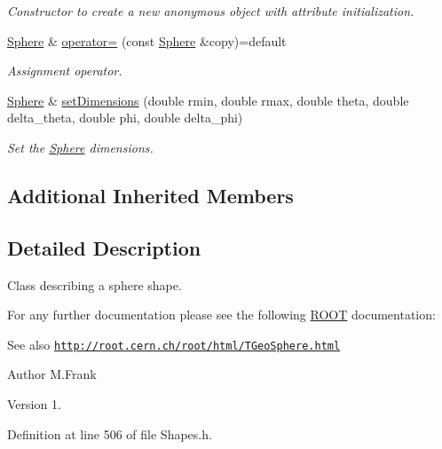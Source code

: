 \begin{DoxyCompactItemize}
\begin{DoxyCompactList}\small\item\em Constructor to create a new anonymous object with attribute initialization. \end{DoxyCompactList}\item 
\hyperlink{class_d_d4hep_1_1_geometry_1_1_sphere}{Sphere} \& \hyperlink{class_d_d4hep_1_1_geometry_1_1_sphere_af5e712c2ced0fafb230be48a60b1bb12}{operator=} (const \hyperlink{class_d_d4hep_1_1_geometry_1_1_sphere}{Sphere} \&copy)=default
\begin{DoxyCompactList}\small\item\em Assignment operator. \end{DoxyCompactList}\item 
\hyperlink{class_d_d4hep_1_1_geometry_1_1_sphere}{Sphere} \& \hyperlink{class_d_d4hep_1_1_geometry_1_1_sphere_a0c80e5f5655ed0211c769d9193461d79}{set\+Dimensions} (double rmin, double rmax, double theta, double delta\+\_\+theta, double phi, double delta\+\_\+phi)
\begin{DoxyCompactList}\small\item\em Set the \hyperlink{class_d_d4hep_1_1_geometry_1_1_sphere}{Sphere} dimensions. \end{DoxyCompactList}\end{DoxyCompactItemize}
\subsection*{Additional Inherited Members}


\subsection{Detailed Description}
Class describing a sphere shape. 

For any further documentation please see the following \hyperlink{namespace_r_o_o_t}{R\+O\+OT} documentation\+: \begin{DoxySeeAlso}{See also}
\href{http://root.cern.ch/root/html/TGeoSphere.html}{\tt http\+://root.\+cern.\+ch/root/html/\+T\+Geo\+Sphere.\+html}
\end{DoxySeeAlso}
\begin{DoxyAuthor}{Author}
M.\+Frank 
\end{DoxyAuthor}
\begin{DoxyVersion}{Version}
1. 
\end{DoxyVersion}


Definition at line 506 of file Shapes.\+h.



